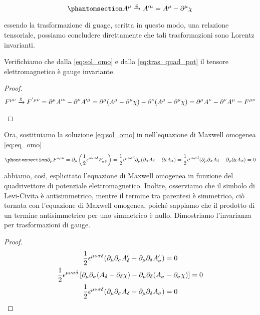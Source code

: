 \begin{equation}\phantomsection\label{eq:tras_quad_pot}
   A^\mu
   \xrightarrow[\text{}]{\text{g}}
  A'^\mu
    =A^\mu-\partial^\mu \chi
\end{equation}
essendo la trasformazione di guage, scritta in questo modo, una relazione tensoriale, possiamo concludere direttamente che tali trasformazioni sono Lorentz invarianti. 

Verifichiamo che dalla \eqref{eq:sol_omo} e dalla \eqref{eq:tras_quad_pot} il tensore elettromagnetico è gauge invariante.
\begin{proof}
\begin{equation}
\begin{gathered}
        F\indices{^{\mu\nu}}
   \xrightarrow[\text{}]{\text{g}}
   F\indices{^{'\mu\nu}}
    =\partial^\mu A'^\nu -\partial^\nu A'^\mu=\partial^\mu (A^\mu-\partial^\mu \chi) -\partial^\nu (A^\mu-\partial^\mu \chi)=\partial^\mu A^\nu -\partial^\nu A^\mu=F\indices{^{\mu\nu}}
\end{gathered}
\end{equation}
\end{proof}

Ora, sostituiamo la soluzione \eqref{eq:sol_omo} in nell'equazione di Maxwell omogenea \eqref{eq:eq_omo}
\begin{equation}\phantomsection\label{eq:pote_omo}
    \partial_\mu F\indices{^{*\mu \nu}}=\partial_\mu\left(\dfrac{1}{2}\epsilon\indices{^{\mu\nu\sigma\delta}} F\indices{_{\sigma\delta}}\right)=\dfrac{1}{2}\epsilon\indices{^{\mu\nu\sigma\delta}}\partial_\mu (\partial_\sigma A_\delta -\partial_\delta A_\sigma)=\dfrac{1}{2}\epsilon\indices{^{\mu\nu\sigma\delta}} (\partial_\mu\partial_\sigma A_\delta -\partial_\mu\partial_\delta A_\sigma)=0
\end{equation}
abbiamo, così, esplicitato l'equazione di Maxwell omogenea in funzione del quadrivettore di potenziale elettromagnetico. Inoltre, osserviamo che il simbolo di Levi-Civita è antisimmetrico, mentre il termine tra parentesi è simmetrico, ciò tornata con l'equazione di Maxwell omogenea, poiché sappiamo che il prodotto di un termine antisimmetrico per uno simmetrico è nullo. Dimostriamo l'invarianza per trasformazioni di gauge.
\begin{proof}
\begin{equation}
\begin{gathered}
       \dfrac{1}{2}\epsilon\indices{^{\mu\nu\sigma\delta}} (\partial_\mu\partial_\sigma A'_\delta -\partial_\mu\partial_\delta A'_\sigma)=0\\
       \dfrac{1}{2}\epsilon\indices{^{\mu\nu\sigma\delta}} \left[\partial_\mu\partial_\sigma (A_\delta-\partial_\delta \chi) -\partial_\mu\partial_\delta (A_\sigma-\partial_\sigma \chi)\right]=0\\
       \dfrac{1}{2}\epsilon\indices{^{\mu\nu\sigma\delta}} (\partial_\mu\partial_\sigma A_\delta -\partial_\mu\partial_\delta A_\sigma)=0
\end{gathered}
\end{equation}
\end{proof}


